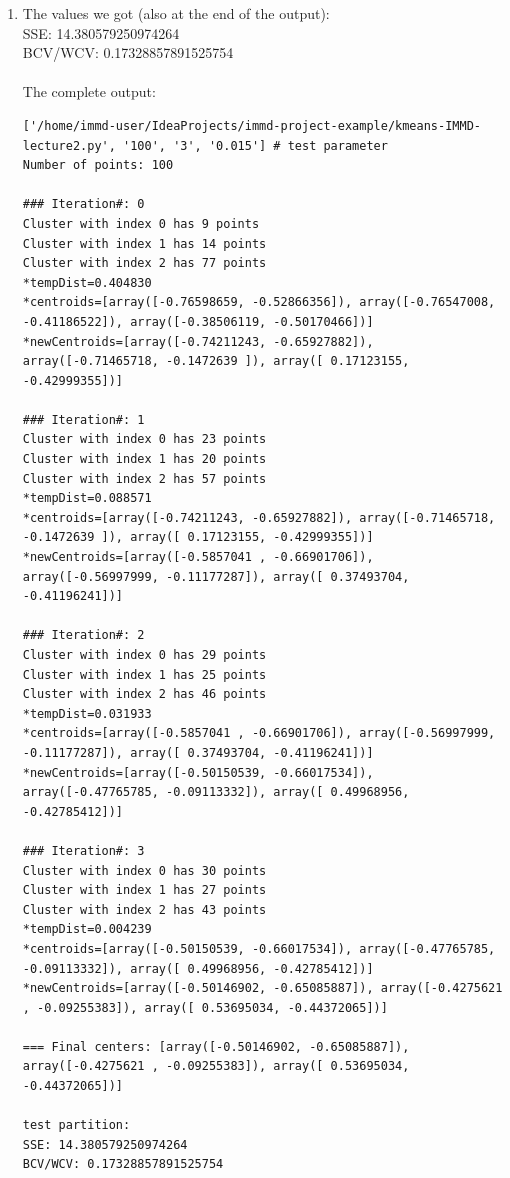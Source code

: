 \documentclass[11pt,a4paper]{scrartcl}
\begin{document}
\lstset{breaklines=true}
\begin{enumerate}
\item The values we got (also at the end of the output):\\
SSE: 14.380579250974264\\
BCV/WCV: 0.17328857891525754\\\\
The complete output:
\begin{lstlisting}
['/home/immd-user/IdeaProjects/immd-project-example/kmeans-IMMD-lecture2.py', '100', '3', '0.015'] # test parameter
Number of points: 100

### Iteration#: 0
Cluster with index 0 has 9 points
Cluster with index 1 has 14 points
Cluster with index 2 has 77 points
*tempDist=0.404830
*centroids=[array([-0.76598659, -0.52866356]), array([-0.76547008, -0.41186522]), array([-0.38506119, -0.50170466])]
*newCentroids=[array([-0.74211243, -0.65927882]), array([-0.71465718, -0.1472639 ]), array([ 0.17123155, -0.42999355])]

### Iteration#: 1
Cluster with index 0 has 23 points
Cluster with index 1 has 20 points
Cluster with index 2 has 57 points
*tempDist=0.088571
*centroids=[array([-0.74211243, -0.65927882]), array([-0.71465718, -0.1472639 ]), array([ 0.17123155, -0.42999355])]
*newCentroids=[array([-0.5857041 , -0.66901706]), array([-0.56997999, -0.11177287]), array([ 0.37493704, -0.41196241])]

### Iteration#: 2
Cluster with index 0 has 29 points
Cluster with index 1 has 25 points
Cluster with index 2 has 46 points
*tempDist=0.031933
*centroids=[array([-0.5857041 , -0.66901706]), array([-0.56997999, -0.11177287]), array([ 0.37493704, -0.41196241])]
*newCentroids=[array([-0.50150539, -0.66017534]), array([-0.47765785, -0.09113332]), array([ 0.49968956, -0.42785412])]

### Iteration#: 3
Cluster with index 0 has 30 points
Cluster with index 1 has 27 points
Cluster with index 2 has 43 points
*tempDist=0.004239
*centroids=[array([-0.50150539, -0.66017534]), array([-0.47765785, -0.09113332]), array([ 0.49968956, -0.42785412])]
*newCentroids=[array([-0.50146902, -0.65085887]), array([-0.4275621 , -0.09255383]), array([ 0.53695034, -0.44372065])]

=== Final centers: [array([-0.50146902, -0.65085887]), array([-0.4275621 , -0.09255383]), array([ 0.53695034, -0.44372065])]

test partition:
SSE: 14.380579250974264
BCV/WCV: 0.17328857891525754


\end{lstlisting}
\end{enumerate}
\end{document}

